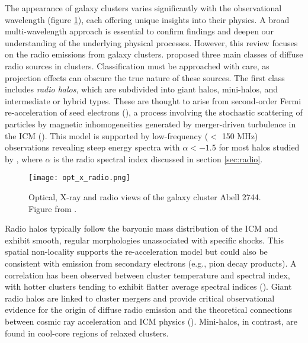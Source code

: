 \documentclass[11pt,letterpaper]{article}
\begin{document}
\medskip
\par The appearance of galaxy clusters varies significantly with the observational wavelength (figure \ref{fig:optical-radio}), each offering unique insights into their physics. A broad multi-wavelength approach is essential to confirm findings and deepen our understanding of the underlying physical processes. However, this review focuses on the radio emissions from galaxy clusters. \cite{van_weeren_diffuse_2019} proposed three main classes of diffuse radio sources in clusters. Classification must be approached with care, as projection effects can obscure the true nature of these sources. The first class includes \textit{radio halos}, which are subdivided into giant halos, mini-halos, and intermediate or hybrid types. These are thought to arise from second-order Fermi re-acceleration of seed electrons (\cite{pasini_ultra-low_2024}), a process involving the stochastic scattering of particles by magnetic inhomogeneities generated by merger-driven turbulence in the ICM (\cite{van_weeren_diffuse_2019}). This model is supported by low-frequency ($<$ 150 MHz) observations revealing steep energy spectra with $\alpha < -1.5$ for most halos studied by \cite{pasini_ultra-low_2024}, where $\alpha$ is the radio spectral index discussed in section \ref{sec:radio}.
\begin{figure}[t]
	\centering
	\texttt{[image: opt\_x\_radio.png]}
	\caption{Optical, X-ray and radio views of the galaxy cluster Abell 2744. Figure from \cite{van_weeren_diffuse_2019}.}
	\label{fig:optical-radio}
\end{figure}

\medskip
\par Radio halos typically follow the baryonic mass distribution of the ICM and exhibit smooth, regular morphologies unassociated with specific shocks. This spatial non-locality supports the re-acceleration model but could also be consistent with emission from secondary electrons (e.g., pion decay products). A correlation has been observed between cluster temperature and spectral index, with hotter clusters tending to exhibit flatter average spectral indices (\cite{giovannini_radio_2009}). Giant radio halos are linked to cluster mergers and provide critical observational evidence for the origin of diffuse radio emission and the theoretical connections between cosmic ray acceleration and ICM physics (\cite{brunetti_cosmic_2014}). Mini-halos, in contrast, are found in cool-core regions of relaxed clusters.
\end{document}
